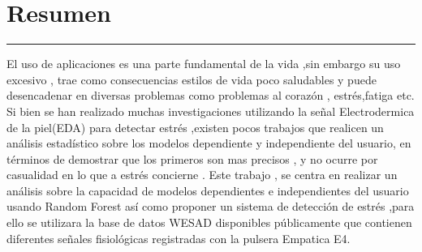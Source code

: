 \chapter*{Resumen}
\hrule \bigskip \vspace*{1cm}


El uso de aplicaciones es una parte fundamental de la vida ,sin embargo su uso excesivo , trae como consecuencias estilos de
vida poco saludables y puede desencadenar en diversas problemas como problemas al corazón , estrés,fatiga etc. Si bien se han realizado
muchas investigaciones utilizando la señal Electrodermica de la piel(EDA) para detectar estrés ,existen pocos trabajos que realicen un
análisis estadístico sobre los modelos dependiente y independiente del usuario, en términos de demostrar que los primeros son mas precisos
, y no ocurre por casualidad en lo que a estrés concierne . Este trabajo , se centra en realizar un análisis sobre la capacidad de modelos dependientes e independientes del usuario usando   Random Forest  así como proponer un  sistema de detección de estrés  ,para
ello se utilizara la base de datos WESAD disponibles públicamente que contienen diferentes señales fisiológicas registradas con la pulsera Empatica E4.